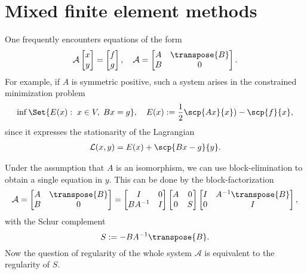 %
\section{Mixed finite element methods}\label{sec:}
%
One frequently encounters equations of the form
%
\begin{equation}\label{eq:SaddlePointSystem}
\mathcal A \begin{bmatrix}x\\y\end{bmatrix}= \begin{bmatrix}f\\g\end{bmatrix},\quad \mathcal A=
\begin{bmatrix}
A & \transpose{B}\\
B & 0
\end{bmatrix}.
\end{equation}
%
For example, if $A$ is symmetric positive, such a system arises in the constrained minimization problem
%
\begin{align*}
\inf \Set{ E(x) :\; x\in V,\; Bx=g },\quad  E(x) := \frac12 \scp{A x}{x} ) -\scp{f}{x},
\end{align*}
%
since it expresses the stationarity of the Lagrangian
%
\begin{align*}
\mathcal L(x,y) = E(x)+ \scp{Bx-g}{y}.
\end{align*}

%
Under the assumption that $A$ is an isomorphism, we can use block-elimination to obtain a single equation in $y$. This can be done by the block-factorization
%
\begin{equation}\label{eq:SystemFactorized}
\mathcal A = \begin{bmatrix}
A & \transpose{B}\\
B & 0
\end{bmatrix}
= 
\begin{bmatrix}
I & 0\\
BA^{-1} & I
\end{bmatrix}
\begin{bmatrix}
A & 0\\
0 & S
\end{bmatrix}
\begin{bmatrix}
I & A^{-1}\transpose{B}\\
0 & I
\end{bmatrix},
\end{equation}
%
with the Schur complement
%
%
\begin{equation}\label{eq:Schur}
S := - BA^{-1}\transpose{B}.
\end{equation}
%
Now the question of regularity of the whole system $\mathcal A$ is equivalent to the regularity of $S$.

